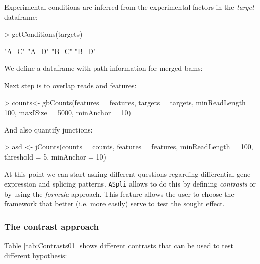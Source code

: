 \documentclass{article}
\begin{document}
Experimental conditions are inferred from the experimental factors in the {\em target} dataframe:

\begin{Schunk}
\begin{Sinput}
> getConditions(targets)
\end{Sinput}
\begin{Soutput}
[1] "A_C" "A_D" "B_C" "B_D"
\end{Soutput}
\end{Schunk}

We define a dataframe with path information for merged bams:

\begin{Schunk}
\end{Schunk}

Next step is to overlap reads and features:

\begin{Schunk}
\begin{Sinput}
> counts<- gbCounts(features       = features, 
                    targets       = targets, 
                    minReadLength = 100,
                    maxISize      = 5000, 
                    minAnchor     = 10)
\end{Sinput}
\end{Schunk}

And also quantify junctions:

\begin{Schunk}
\begin{Sinput}
> asd         <-  jCounts(counts          = counts, 
                           features      = features,
                           minReadLength = 100,
                           threshold     = 5,
                           minAnchor     = 10)
\end{Sinput}
\end{Schunk}

At this point we can start asking different questions regarding differential gene expression and splicing patterns. \texttt{ASpli} allows to do this by defining {\em contrasts} or by using the {\em formula} approach. This feature allows the user to choose the framework that better (i.e. more easily) serve to test the sought effect.

\subsubsection{The contrast approach}\label{sec:contrast}
Table \ref{tab:Contrasts01} shows different contrasts that can be used to test different hypothesis:
\end{document}
